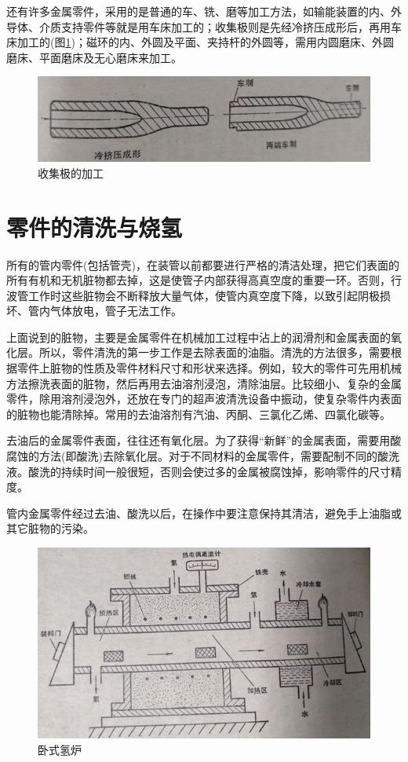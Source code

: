 还有许多金属零件，采用的是普通的车、铣、磨等加工方法，如输能装置的内、外导体、介质支持零件等就是用车床加工的；收集极则是先经冷挤压成形后，再用车床加工的(图\ref{ch10-6})；磁环的内、外圆及平面、夹持杆的外圆等，需用内圆磨床、外圆磨床、平面磨床及无心磨床来加工。
\begin{figure}[phtb]
	\centering
	\includegraphics[width=0.7\linewidth]{figure/ch10-6}
	\caption{ 收集极的加工}
	\label{ch10-6}
\end{figure}
\section{零件的清洗与烧氢}
所有的管内零件(包括管壳)，在装管以前都要进行严格的清洁处理，把它们表面的所有有机和无机脏物都去掉，这是使管子内部获得高真空度的重要一环。否则，行波管工作时这些脏物会不断释放大量气体，使管内真空度下降，以致引起阴极损坏、管内气体放电，管子无法工作。


上面说到的脏物，主要是金属零件在机械加工过程中沾上的润滑剂和金属表面的氧化层。所以，零件清洗的第一步工作是去除表面的油脂。清洗的方法很多，需要根据零件上脏物的性质及零件材料尺寸和形状来选择。例如，较大的零件可先用机械方法擦洗表面的脏物，然后再用去油溶剂浸泡，清除油层。比较细小、复杂的金属零件，除用溶剂浸泡外，还放在专门的超声波清洗设备中振动，使复杂零件内表面的脏物也能清除掉。常用的去油溶剂有汽油、丙酮、三氯化乙烯、四氯化碳等。


去油后的金属零件表面，往往还有氧化层。为了获得“新鲜”的金属表面，需要用酸腐蚀的方法(即酸洗)去除氧化层。对于不同材料的金属零件，需要配制不同的酸洗液。酸洗的持续时间一般很短，否则会使过多的金属被腐蚀掉，影响零件的尺寸精度。


管内金属零件经过去油、酸洗以后，在操作中要注意保持其清洁，避免手上油脂或其它脏物的污染。
\begin{figure}[phtb]
	\centering
	\includegraphics[width=0.75\linewidth]{figure/ch10-7}
	\caption{卧式氢炉}
	\label{ch10-7}
\end{figure}

